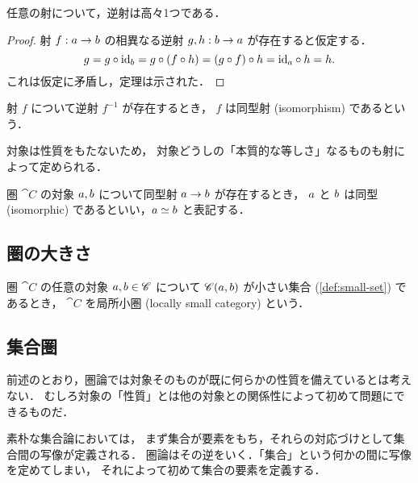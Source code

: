 \documentclass[titlepage]{ltjsreport}
\newtheorem[S]{theorem}{定理}[chapter]
\newtheorem[S]{definition}[theorem]{定義}
\newtheorem[S]{example}[theorem]{例}
\begin{document}
\begin{theorem}[逆射の一意性]
  任意の射について，逆射は高々1つである．
\end{theorem}

\begin{proof}
  \def\a{\obj{a}}%
  \def\b{\obj{b}}%
  射 $\mrp{f}{\a}{\b}$ の相異なる逆射 $\mrp{g,h}{\b}{\a}$ が存在すると仮定する．
  \begin{equation*}
    g=g\circ\id{\b}=g\circ(f\circ h)=(g\circ f)\circ h=\id{\a}\circ h=h.
  \end{equation*}
  これは仮定に矛盾し，定理は示された．
\end{proof}

\begin{definition}[同型射]
  射 $f$ について逆射 $f^{-1}$ が存在するとき，
  $f$ は同型射 (isomorphism) であるという．
\end{definition}

対象は性質をもたないため，
対象どうしの「本質的な等しさ」なるものも射によって定められる．

\begin{definition}[同型]
  \def\a{\obj{a}}%
  \def\b{\obj{b}}%
  圏 $\cat{C}$ の対象 $\a,\b$ について同型射 $\a\to\b$ が存在するとき，
  $\a$ と $\b$ は同型 (isomorphic) であるといい，$\a\simeq\b$ と表記する．
\end{definition}

\subsection{圏の大きさ}

\begin{definition}[局所小圏]
  \def\C{\cat{C}}%
  \def\a{\obj{a}}%
  \def\b{\obj{b}}%
  圏 $\C$ の任意の対象 $\a,\b\in\C$ について
  $\mrps{\C}{\a}{\b}$ が小さい集合 (\cref{def:small-set}) であるとき，
  $\C$ を局所小圏 (locally small category) という．
\end{definition}

\subsection{集合圏}

前述のとおり，圏論では対象そのものが既に何らかの性質を備えているとは考えない．
むしろ対象の「性質」とは他の対象との関係性によって初めて問題にできるものだ．

素朴な集合論においては，
まず集合が要素をもち，それらの対応づけとして集合間の写像が定義される．
圏論はその逆をいく．「集合」という何かの間に写像を定めてしまい，
それによって初めて集合の要素を定義する．
\end{document}
